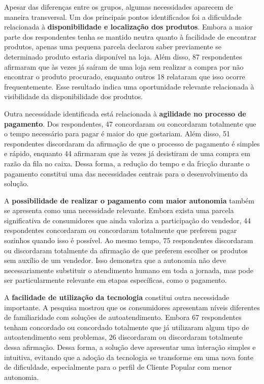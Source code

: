 Apesar das diferenças entre os grupos, algumas necessidades aparecem de maneira transversal. Um dos principais pontos identificados foi a dificuldade relacionada à \textbf{disponibilidade e localização dos produtos}. Embora a maior parte dos respondentes tenha se mantido neutra quanto à facilidade de encontrar produtos, apenas uma pequena parcela declarou saber previamente se determinado produto estaria disponível na loja. Além disso, 87 respondentes afirmaram que às vezes já saíram de uma loja sem realizar a compra por não encontrar o produto procurado, enquanto outros 18 relataram que isso ocorre frequentemente. Esse resultado indica uma oportunidade relevante relacionada à visibilidade da disponibilidade dos produtos.

Outra necessidade identificada está relacionada à \textbf{agilidade no processo de pagamento}. Dos respondentes, 47 concordaram ou concordaram totalmente que o tempo necessário para pagar é maior do que gostariam. Além disso, 51 respondentes discordaram da afirmação de que o processo de pagamento é simples e rápido, enquanto 44 afirmaram que às vezes já desistiram de uma compra em razão da fila no caixa. Dessa forma, a redução do tempo e da fricção durante o pagamento constitui uma das necessidades centrais para o desenvolvimento da solução.

A \textbf{possibilidade de realizar o pagamento com maior autonomia} também se apresenta como uma necessidade relevante. Embora exista uma parcela significativa de consumidores que ainda valoriza a participação do vendedor, 44 respondentes concordaram ou concordaram totalmente que preferem pagar sozinhos quando isso é possível. Ao mesmo tempo, 75 respondentes discordaram ou discordaram totalmente da afirmação de que preferem escolher os produtos sem auxílio de um vendedor. Isso demonstra que a autonomia não deve necessariamente substituir o atendimento humano em toda a jornada, mas pode ser particularmente relevante em etapas específicas, como o pagamento.

A \textbf{facilidade de utilização da tecnologia} constitui outra necessidade importante. A pesquisa mostrou que os consumidores apresentam níveis diferentes de familiaridade com soluções de autoatendimento. Embora 67 respondentes tenham concordado ou concordado totalmente que já utilizaram algum tipo de autoatendimento sem problemas, 26 discordaram ou discordaram totalmente dessa afirmação. Dessa forma, a solução deve apresentar uma interação simples e intuitiva, evitando que a adoção da tecnologia se transforme em uma nova fonte de dificuldade, especialmente para o perfil de Cliente Popular com menor autonomia.


